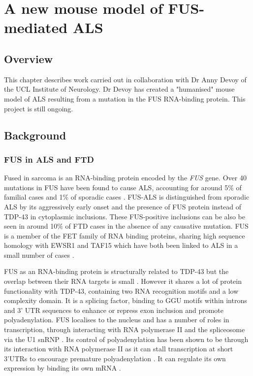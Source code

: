 \chapter{A new mouse model of FUS-mediated ALS}

\section{Overview}
This chapter describes work carried out in collaboration with Dr Anny Devoy of the UCL Institute of Neurology. Dr Devoy has created a "humanised" mouse model of ALS resulting from a mutation in the FUS RNA-binding protein. This project is still ongoing.

\section{Background}

\subsection{FUS in ALS and FTD}
Fused in sarcoma is an RNA-binding protein encoded by the \textit{FUS} gene. Over 40 mutations in FUS have been found to cause ALS, accounting for around 5\% of familial cases and 1\% of sporadic cases \citep{Vance2009-ye,Tan07102016}. FUS-ALS is distinguished from sporadic ALS by its aggressively early onset and the presence of FUS protein instead of TDP-43 in cytoplasmic inclusions. These FUS-positive inclusions can be also be seen in around 10\% of FTD cases \citep{Neumann2009} in the absence of any causative mutation. FUS is a member of the FET family of RNA binding proteins, sharing high sequence homology with EWSR1 and TAF15 \citep{Kovar2011} which have both been linked to ALS in a small number of cases \citep{Neumann2011, Couthouis2011,Ticozzi2011-bs,Couthouis2012}.

FUS as an RNA-binding protein is structurally related to TDP-43 but the overlap between their RNA targets is small \citep{Lagier-Tourenne2012-wa,Rogelj2012,Colombrita2012, Honda2014}. However it shares a lot of protein functionality with TDP-43, containing two RNA recognition motifs and a low complexity domain. It is a splicing factor, binding to GGU motifs within introns and 3' UTR sequences \citep{Rogelj2012,Lagier-Tourenne2012-wa} to enhance or repress exon inclusion and promote polyadenylation. FUS localises to the nucleus and has a number of roles in transcription, through interacting with RNA polymerase II and the spliceosome via the U1 snRNP \citep{Sun2015a, Yu2015}. Its control of polyadenylation has been shown to be through its interaction with RNA polymerase II as it can stall transcription at short 3'UTRs to encourage premature polyadenylation \citep{Masuda2015}. It can regulate its own expression by binding its own mRNA \citep{Zhou2013}.

